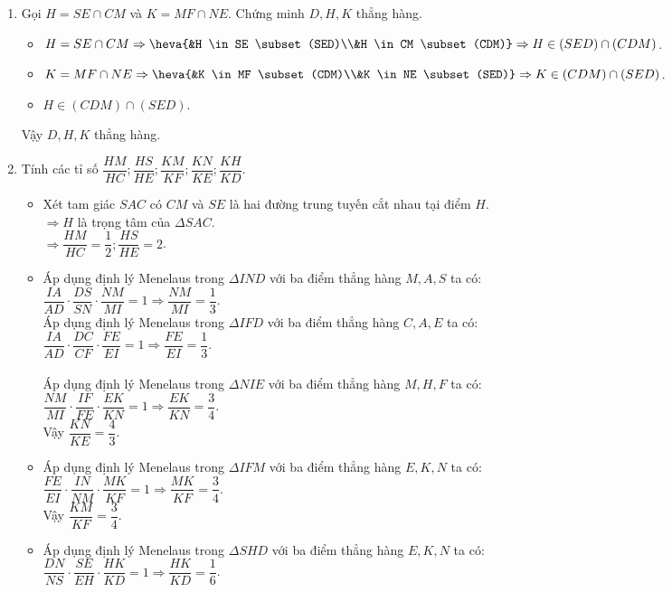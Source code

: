 \begin{bt}
\begin{bt}
{\begin{enumerate}
			
			\item Gọi $H=SE \cap CM$ và $K=MF \cap NE$. Chứng minh $D, H, K$ thẳng hàng.
			\begin{itemize}
				\item $H=SE \cap CM \Rightarrow \heva{&H \in SE \subset (SED)\\&H \in CM \subset (CDM)} \Rightarrow H \in (SED) \cap (CDM)$.
				\item $K = MF \cap NE \Rightarrow \heva{&K \in MF \subset (CDM)\\&K \in NE \subset (SED)} \Rightarrow K \in (CDM) \cap (SED)$.
				\item $H \in (CDM) \cap (SED)$.	
			\end{itemize}
			Vậy $D, H, K$ thẳng hàng.
			\item Tính các tỉ số $\dfrac{HM}{HC}; \dfrac{HS}{HE}; \dfrac{KM}{KF}; \dfrac{KN}{KE}; \dfrac{KH}{KD}$.
			\begin{itemize}
				\item Xét tam giác $SAC$ có $CM$ và $SE$ là hai đường trung tuyến cắt nhau tại điểm $H$.\\
				$ \Rightarrow H$ là trọng tâm của $\Delta SAC$.\\
				$\Rightarrow \dfrac{HM}{HC}=\dfrac{1}{2}; \dfrac{HS}{HE}=2$.
				\item Áp dụng định lý Menelaus trong $\Delta IND$ với ba điểm thẳng hàng $M, A, S$ ta có$\colon$\\$\dfrac{IA}{AD}\cdot \dfrac{DS}{SN}\cdot \dfrac{NM}{MI}=1 \Rightarrow \dfrac{NM}{MI}=\dfrac{1}{3}$.\\
				Áp dụng định lý Menelaus trong $\Delta IFD$ với ba điểm thẳng hàng $C, A, E$ ta có$\colon$\\$\dfrac{IA}{AD}\cdot \dfrac{DC}{CF}\cdot \dfrac{FE}{EI}=1 \Rightarrow \dfrac{FE}{EI}=\dfrac{1}{3}$.\\
				\\Áp dụng định lý Menelaus trong $\Delta NIE$ với ba điểm thẳng hàng $M, H, F$ ta có$\colon$\\$\dfrac{NM}{MI}\cdot \dfrac{IF}{FE}\cdot \dfrac{EK}{KN}=1 \Rightarrow \dfrac{EK}{KN}=\dfrac{3}{4}$.\\
				Vậy $\dfrac{KN}{KE}=\dfrac{4}{3}$.
				\item 
				Áp dụng định lý Menelaus trong $\Delta IFM$ với ba điểm thẳng hàng $E, K, N$ ta có$\colon$\\$\dfrac{FE}{EI}\cdot \dfrac{IN}{NM}\cdot \dfrac{MK}{KF}=1 \Rightarrow \dfrac{MK}{KF}=\dfrac{3}{4}$.\\
				Vậy $\dfrac{KM}{KF}=\dfrac{3}{4}$.
				\item Áp dụng định lý Menelaus trong $\Delta SHD$ với ba điểm thẳng hàng $E, K, N$ ta có$\colon$\\$\dfrac{DN}{NS}\cdot \dfrac{SE}{EH}\cdot \dfrac{HK}{KD}=1 \Rightarrow \dfrac{HK}{KD}=\dfrac{1}{6}$.\\
			\end{itemize}
		\end{enumerate}
		
}
\end{bt}
\end{bt}

